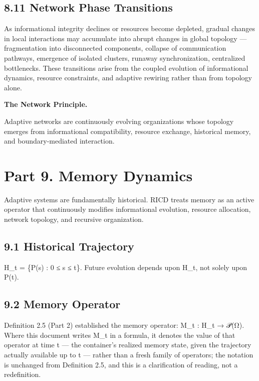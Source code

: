 \documentclass[
]{article}
\begin{document}
\hypertarget{network-phase-transitions}{%
\subsection{8.11 Network Phase
Transitions}\label{network-phase-transitions}}

As informational integrity declines or resources become depleted,
gradual changes in local interactions may accumulate into abrupt changes
in global topology --- fragmentation into disconnected components,
collapse of communication pathways, emergence of isolated clusters,
runaway synchronization, centralized bottlenecks. These transitions
arise from the coupled evolution of informational dynamics, resource
constraints, and adaptive rewiring rather than from topology alone.

\textbf{The Network Principle.}

Adaptive networks are continuously evolving organizations whose topology
emerges from informational compatibility, resource exchange, historical
memory, and boundary-mediated interaction.

\hypertarget{part-9.-memory-dynamics}{%
\section{Part 9. Memory Dynamics}\label{part-9.-memory-dynamics}}

Adaptive systems are fundamentally historical. RICD treats memory as an
active operator that continuously modifies informational evolution,
resource allocation, network topology, and recursive organization.

\hypertarget{historical-trajectory}{%
\subsection{9.1 Historical Trajectory}\label{historical-trajectory}}

H\_t = \{P(s) : 0 ≤ s ≤ t\}. Future evolution depends upon H\_t, not
solely upon P(t).

\hypertarget{memory-operator}{%
\subsection{9.2 Memory Operator}\label{memory-operator}}

Definition 2.5 (Part 2) established the memory operator: M\_t : H\_t →
𝒫(Ω). Where this document writes M\_t in a formula, it denotes the value
of that operator at time t --- the container's realized memory state,
given the trajectory actually available up to t --- rather than a fresh
family of operators; the notation is unchanged from Definition 2.5, and
this is a clarification of reading, not a redefinition.
\end{document}
